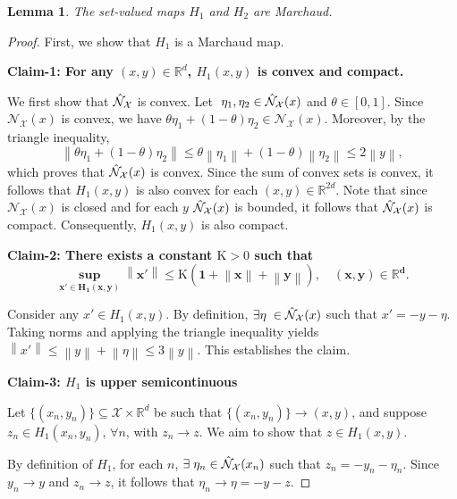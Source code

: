 \documentclass[9pt,journal,twoside,web]{ieeecolor}
\newtheorem{lemma}{Lemma}
\newcommand{\norm}[1]{\left\lVert #1 \right\rVert}
\begin{document}
\begin{lemma}
    The set-valued maps $H_1$ and $H_2$   are Marchaud.
    \label{Marchaud}
\end{lemma}

\begin{proof}
First, we show that $H_1$ is a Marchaud map. 

\textbf{Claim-1: For any $(x,y) \in \mathbb{R}^d$,  $H_1(x,y)$ is convex and compact.}

We first show that $\Hat{\mathcal{N}}_\mathcal{X}$ is convex. 
Let $ \; \eta_1, \eta_2 \in \Hat{\mathcal{N}}_\mathcal{X}(x)$   and $\theta \in [ 0,1]$. Since $\mathcal{N}_\mathcal{X}(x)$ is convex, we have $ \theta \eta_1 + (1-\theta) \eta_2 \in \mathcal{N}_\mathcal{X} (x)$.
Moreover, by the triangle inequality,
\begin{equation*}
    \norm{\theta \eta_1 + (1-\theta) \eta_2} \leq \theta \norm{\eta_1} + (1- \theta) \norm{\eta_2} \leq 2 \norm{y},
\end{equation*}
which proves that $\Hat{\mathcal{N}}_\mathcal{X}(x)$ is convex. Since the sum of convex sets is convex, it follows that $H_1(x,y)$ is also convex for each $(x,y) \in \mathbb{R}^{2d}$.
Note that since $\mathcal{N}_\mathcal{X}(x)$ is closed and for each $y$ $\Hat{\mathcal{N}}_\mathcal{X}(x)$ is bounded, it follows that $\Hat{\mathcal{N}}_\mathcal{X}(x)$ is  compact. Consequently, $H_1(x,y)$ is also compact. 


\textbf{Claim-2: There exists a constant $\mathrm{K} > 0$ such that 
        \begin{equation*}
           \mathbf{ \sup\limits_{x' \in H_1(x,y)} \norm{x'} \leq \mathrm{K} (1 + \norm{x} + \norm{y}), \quad (x,y) \in \mathbb{R}^d.}
        \end{equation*}}

        Consider any $x' \in H_1(x,y)$. By definition,  $\exists \eta \; \in \Hat{\mathcal{N}}_\mathcal{X}(x)$ such that $  x' = -y -\eta$.
Taking norms and applying the triangle inequality yields
 $\norm{x'} \leq \norm{y} + \norm{\eta} \leq 3 \norm{y}$.
This establishes the claim. 

\textbf{Claim-3: $H_1$ is upper semicontinuous}

Let $\{ (x_n ,y_n) \} \subseteq \mathcal{X} \times \mathbb{R}^d$ be such that $\{ (x_n ,y_n) \}  \to (x,y)$,  and suppose $z_n \in H_1(x_n,y_n)$, $\forall n$, with $z_n \to z$. We aim to show that $z \in H_1(x,y)$.

By definition of $H_1$, for each $n$, $\exists \; \eta_n \in \Hat{\mathcal{N}}_\mathcal{X}(x_n)$ such that $ z_n = - y_n - \eta_n$.
Since $y_n \to y$ and $z_n \to z$, it follows that $\eta_n \to \eta = - y - z$. 


\end{proof}
\end{document}
